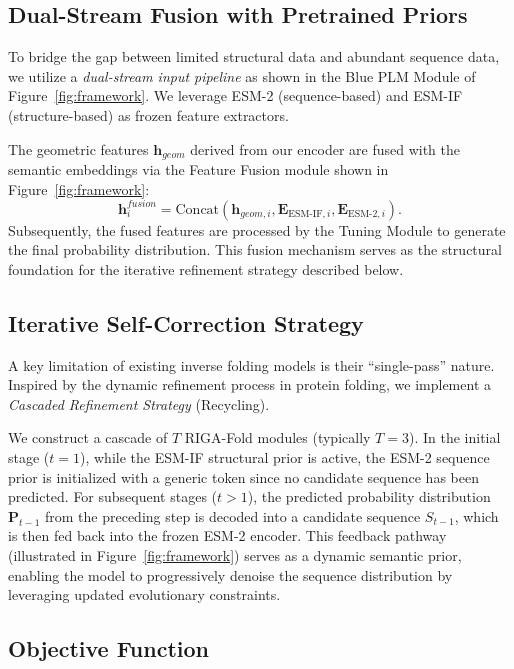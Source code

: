 \documentclass{article}
\theoremstyle{plain}
\theoremstyle{definition}
\theoremstyle{remark}
\begin{document}
{\subsection{Dual-Stream Fusion with Pretrained Priors}\label{sec:priors}

To bridge the gap between limited structural data and abundant sequence data, we utilize a \textit{dual-stream input pipeline} as shown in the Blue PLM Module of Figure~\ref{fig:framework}. We leverage ESM-2 (sequence-based) and ESM-IF (structure-based) as frozen feature extractors.

The geometric features $\mathbf{h}_{geom}$ derived from our encoder are fused with the semantic embeddings via the Feature Fusion module shown in Figure~\ref{fig:framework}:
\begin{equation}\label{eq:fusion}
    \mathbf{h}_i^{fusion} = \mathrm{Concat}(\mathbf{h}_{geom,i}, \mathbf{E}_{\mathrm{ESM\text{-}IF}, i}, \mathbf{E}_{\mathrm{ESM\text{-}2}, i}).
\end{equation}
Subsequently, the fused features are processed by the Tuning Module to generate the final probability distribution. This fusion mechanism serves as the structural foundation for the iterative refinement strategy described below.

\subsection{Iterative Self-Correction Strategy}\label{sec:recycling}

A key limitation of existing inverse folding models is their ``single-pass'' nature. Inspired by the dynamic refinement process in protein folding, we implement a \textit{Cascaded Refinement Strategy} (Recycling).

We construct a cascade of $T$ RIGA-Fold modules (typically $T=3$). In the initial stage ($t=1$), while the ESM-IF structural prior is active, the ESM-2 sequence prior is initialized with a generic token since no candidate sequence has been predicted. For subsequent stages ($t > 1$), the predicted probability distribution $\mathbf{P}_{t-1}$ from the preceding step is decoded into a candidate sequence $S_{t-1}$, which is then fed back into the frozen ESM-2 encoder. This feedback pathway (illustrated in Figure~\ref{fig:framework}) serves as a dynamic semantic prior, enabling the model to progressively denoise the sequence distribution by leveraging updated evolutionary constraints.

\subsection{Objective Function}

}
\end{document}
